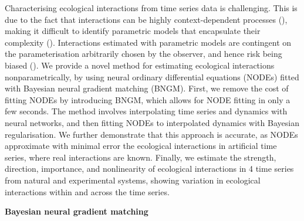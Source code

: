 \documentclass[11pt, oneside]{article}
\begin{document}
Characterising ecological interactions from time series data is challenging.
This is due to the fact that interactions can be highly context-dependent processes (\cite{Song2021}), making it difficult to identify parametric models that encapsulate their complexity (\cite{Wood2001}).
Interactions estimated with parametric models are contingent on the parameterisation arbitrarily chosen by the observer, and hence risk being biased (\cite{Wood2001,Adamson2013}).
We provide a novel method for estimating ecological interactions nonparametrically, by using neural ordinary differential equations (NODEs) fitted with Bayesian neural gradient matching (BNGM). 
First, we remove the cost of fitting NODEs by introducing BNGM, which allows for NODE fitting in only a few seconds. 
The method involves interpolating time series and dynamics with neural networks, and then fitting NODEs to interpolated dynamics with Bayesian regularisation.
We further demonstrate that this approach is accurate, as NODEs approximate with minimal error the ecological interactions in artificial time series, where real interactions are known. 
Finally, we estimate the strength, direction, importance, and nonlinearity of ecological interactions in 4 time series from natural and experimental systems, showing variation in ecological interactions within and across the time series.

\textbf{Bayesian neural gradient matching}
\end{document}

